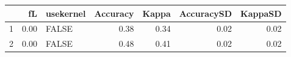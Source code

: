 \begin{table}[ht]
\begin{center}
{\tiny
\begin{tabular}{rrlrrrr}
  \hline
 & fL & usekernel & Accuracy & Kappa & AccuracySD & KappaSD \\ 
  \hline
1 & 0.00 & FALSE & 0.38 & 0.34 & 0.02 & 0.02 \\ 
  2 & 0.00 & FALSE & 0.48 & 0.41 & 0.02 & 0.02 \\ 
   \hline
\end{tabular}
}
\end{center}
\end{table}
